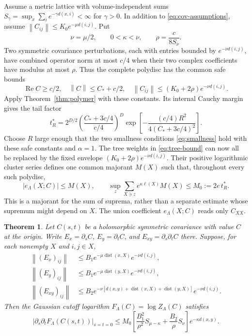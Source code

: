 \documentclass[11pt]{article}
\newtheorem{theorem}{Theorem}[section]
\theoremstyle{remark}
\newcommand{\Rea}{\operatorname{Re}}
\newcommand{\norm}[1]{\left\|#1\right\|}
\begin{document}
Assume a metric lattice with volume-independent sums
$S_\gamma=\sup_x\sum_i e^{-\gamma d(x,i)}<\infty$ for
$\gamma>0$. In addition to \eqref{eq:cov-assumptions}, assume
$\norm{C_{ij}}\le K_0e^{-\mu d(i,j)}$. Put
\[
 \nu=\mu/2,\qquad 0<\kappa<\nu,\qquad
 \rho=\frac{c}{8S_\nu}.
\]
Two symmetric covariance perturbations, each with entries bounded by
$e^{-\nu d(i,j)}$, have combined operator norm at most $c/4$ when
their two complex coefficients have modulus at most $\rho$.
Thus the complete polydisc has the common safe bounds
\[
 \Rea C\ge c/2,
 \quad\norm C\le C_*+c/2,
 \quad\norm{C_{ij}}\le (K_0+2\rho)e^{-\nu d(i,j)}.
\]
Apply Theorem~\ref{thm:polymer} with these constants. Its internal
Cauchy margin gives the tail factor
\[
 t_R^*=2^{D/2}
 \left(\frac{C_*+3c/4}{c/4}\right)^D
 \exp\!\left[-\frac{(c/4)R^2}{4(C_*+3c/4)^2}\right].
\]
Choose $R$ large enough that the two smallness conditions
\eqref{eq:smallness} hold with these safe constants and $\alpha=1$.
The tree weights in \eqref{eq:tree-bound} can now all be replaced by
the fixed envelope $(K_0+2\rho)e^{-\nu d(i,j)}$. Their positive
logarithmic cluster series defines one common majorant $M(X)$ such
that, throughout every such polydisc,
\begin{equation}\label{eq:common-majorant}
 |e_\Lambda(X;C)|\le M(X),\qquad
 \sup_z\sum_{X\ni z}e^{\kappa\ell(X)}M(X)
 \le M_0:=2e\,t_R^*.
\end{equation}
This is a majorant for the sum of suprema, rather than a separate
estimate whose supremum might depend on $X$.
The union coefficient $e_\Lambda(X;C)$ reads only $C_{XX}$.

\begin{theorem}\label{thm:direct-hessian}
Let $C(s,t)$ be a holomorphic symmetric covariance with value $C$
at the origin. Write $E_x=\partial_sC$, $E_y=\partial_tC$, and
$E_{xy}=\partial_s\partial_tC$ there. Suppose, for each nonempty
$X$ and $i,j\in X$,
\begin{align*}
 \norm{(E_x)_{ij}}&\le B_1e^{-\mu\operatorname{dist}(x,X)}
                            e^{-\nu d(i,j)},\\
 \norm{(E_y)_{ij}}&\le B_1e^{-\mu\operatorname{dist}(y,X)}
                            e^{-\nu d(i,j)},\\
 \norm{(E_{xy})_{ij}}&\le B_2
 e^{-\nu[d(x,y)+\operatorname{dist}(x,X)+\operatorname{dist}(y,X)]}
 e^{-\nu d(i,j)}.
\end{align*}
Then the Gaussian cutoff logarithm $F_\Lambda(C)=\log Z_\Lambda(C)$
satisfies
\begin{equation}\label{eq:direct-hessian}
 |\partial_s\partial_tF_\Lambda(C(s,t))|_{s=t=0}
 \le M_0\left[
 \frac{B_1^2}{\rho^2}S_{\mu-\kappa}
 +\frac{B_2}{\rho}S_\nu\right]e^{-\kappa d(x,y)}.
\end{equation}
\end{theorem}
\end{document}

